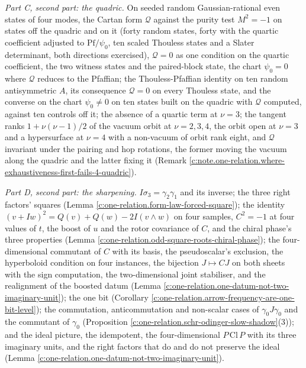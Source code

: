 \documentclass[11pt]{article}
\theoremstyle{definition}
\theoremstyle{plain}
\providecommand{\Cl}{}\renewcommand{\Cl}{\mathrm{Cl}}
\begin{document}
\emph{Part C, second part: the quadric.} On seeded random Gaussian-rational even states of four modes, the Cartan form $\mathcal{Q}$ against the purity test $M^{2} = -1$ on states off the quadric and on it (forty random states, forty with the quartic coefficient adjusted to $\mathrm{Pf}/\psi_{0}$, ten scaled Thouless states and a Slater determinant, both directions exercised), $\mathcal{Q} = 0$ as one condition on the quartic coefficient, the two witness states and the paired-block state, the chart $\psi_{0} = 0$ where $\mathcal{Q}$ reduces to the Pfaffian; the Thouless-Pfaffian identity on ten random antisymmetric $A$, its consequence $\mathcal{Q} = 0$ on every Thouless state, and the converse on the chart $\psi_{0} \neq 0$ on ten states built on the quadric with $\mathcal{Q}$ computed, against ten controls off it; the absence of a quartic term at $\nu = 3$; the tangent ranks $1 + \nu(\nu-1)/2$ of the vacuum orbit at $\nu = 2, 3, 4$, the orbit open at $\nu = 3$ and a hypersurface at $\nu = 4$ with a non-vacuum of orbit rank eight, and $\mathcal{Q}$ invariant under the pairing and hop rotations, the former moving the vacuum along the quadric and the latter fixing it (Remark \ref{c:note.one-relation.where-exhaustiveness-first-fails-4-quadric}).

\emph{Part D, second part: the sharpening.} $I\sigma_{3} = \gamma_{2}\gamma_{1}$ and its inverse; the three right factors' squares (Lemma \ref{c:one-relation.form-law-forced-square}); the identity $(v + Iw)^{2} = Q(v) + Q(w) - 2I(v \wedge w)$ on four samples, $C^{2} = -1$ at four values of $t$, the boost of $u$ and the rotor covariance of $C$, and the chiral phase's three properties (Lemma \ref{c:one-relation.odd-square-roots-chiral-phase}); the four-dimensional commutant of $C$ with its basis, the pseudoscalar's exclusion, the hyperboloid condition on four instances, the bijection $J \mapsto CJ$ on both sheets with the sign computation, the two-dimensional joint stabiliser, and the realignment of the boosted datum (Lemma \ref{c:one-relation.one-datum-not-two-imaginary-unit}); the one bit (Corollary \ref{c:one-relation.arrow-frequency-are-one-bit-level}); the commutation, anticommutation and non-scalar cases of $\gamma_{0}J\gamma_{0}$ and the commutant of $\gamma_{0}$ (Proposition \ref{c:one-relation.schr-odinger-slow-shadow}(3)); and the ideal picture, the idempotent, the four-dimensional $P\,\Cl\,P$ with its three imaginary units, and the right factors that do and do not preserve the ideal (Lemma \ref{c:one-relation.one-datum-not-two-imaginary-unit}).
\end{document}
